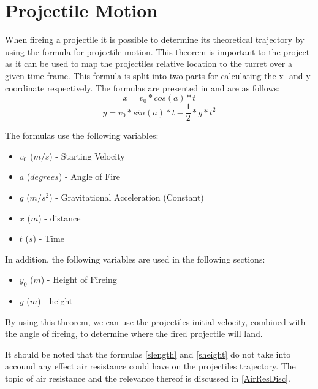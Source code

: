 \section{Projectile Motion}\label{ProjMotion}
When fireing a projectile it is possible to determine its theoretical trajectory
by using the formula for projectile motion. This theorem is important to the
project as it can be used to map the projectiles relative location to the turret
over a given time frame. This formula is split into two parts for calculating
the x- and y-coordinate respectively. The formulas are presented in
\citep[Ch. 6.2]{OrbitBA} and are as follows:
\begin{equation}\label{slength}
x=v_0*cos(a)*t
\end{equation}
\begin{equation}\label{sheight}
y=v_0*sin(a)*t-\frac{1}{2}*g*t^2
\end{equation}

The formulas use the following variables:
\begin{itemize}
  \item $v_0$ ($m/s$) - Starting Velocity 
  \item $a$ ($degrees$) - Angle of Fire 
  \item $g$ ($m/s^2$) - Gravitational Acceleration (Constant)
  \item $x$ ($m$) - distance
  \item $t$ ($s$) - Time
\end{itemize}
In addition, the following variables are used in the following sections:
\begin{itemize}
  \item $y_0$ ($m$) - Height of Fireing 
  \item $y$ ($m$) - height
\end{itemize}

By using this theorem, we can use the projectiles initial velocity, combined
with the angle of fireing, to determine where the fired projectile will land.\nl


It should be noted that the formulas \autoref{slength} and \autoref{sheight} do
not take into accound any effect air resistance could have on the projectiles
trajectory. The topic of air resistance and the relevance thereof is discussed
in \autoref{AirResDisc}.

